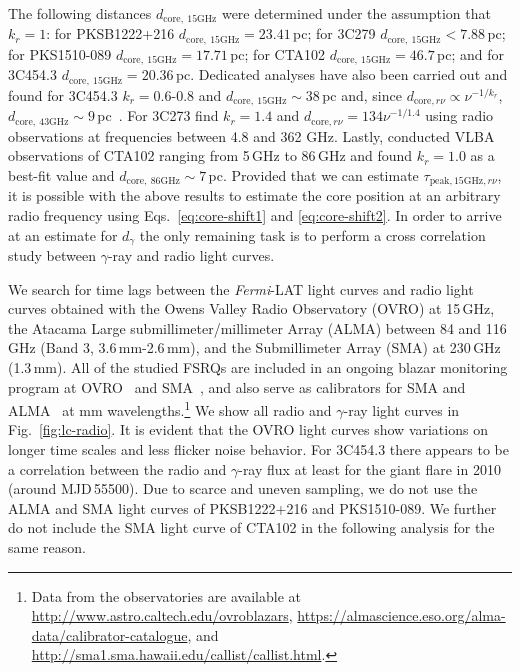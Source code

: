 \documentclass[twocolumn,linenumbers]{aastex62}
\newcommand{\gray}{$\gamma$-ray\xspace}
\newcommand{\fermiLAT}{\emph{Fermi}-LAT\xspace}
\begin{document}
The following distances $d_\mathrm{core,~15GHz}$ were determined  under the assumption that $k_r = 1$: for PKSB1222+216 $d_\mathrm{core,~15GHz}= 23.41\,$pc; for 3C279 $d_\mathrm{core,~15GHz}<7.88$\,pc; for PKS1510-089 $d_\mathrm{core,~15GHz} = 17.71\,$pc; for 
CTA102 $d_\mathrm{core,~15GHz} =46.7\,$pc; and for 3C454.3 $d_\mathrm{core,~15GHz} = 20.36\,$pc.
Dedicated analyses have also been carried out and found for 3C454.3 $k_r = 0.6$-$0.8$ and $d_\mathrm{core,~15GHz} \sim 38\,$pc and, since $d_{\mathrm{core},r\nu}\propto\nu^{-1/k_r}$,  $d_\mathrm{core,~43GHz} \sim 9\,$pc~\citep{2014MNRAS.437.3396K}. 
For 3C273 \citet{2013ARep...57...34V} find $k_r = 1.4$ and $d_{\mathrm{core},r\nu} = 134\nu^{-1/1.4}$ using radio observations at frequencies between 4.8 and 362 GHz.
Lastly, \citet{2015A&A...576A..43F} conducted VLBA observations of CTA102 ranging from 5\,GHz to 86\,GHz and found $k_r = 1.0$ as a best-fit value and $d_{\mathrm{core,~86GHz}}\sim7\,$pc.
Provided that we can estimate $\tau_{\mathrm{peak,15GHz},r\nu}$, it is possible with the above results to estimate the core position at an arbitrary radio frequency using Eqs.~\ref{eq:core-shift1} and \ref{eq:core-shift2}.
In order to arrive at an estimate for $d_\gamma$ the only remaining task is to perform a cross correlation study between \gray and radio light curves.

We search for time lags between the \fermiLAT light curves and radio light curves obtained with the Owens Valley Radio Observatory (OVRO) at 15\,GHz, the Atacama Large submillimeter/millimeter Array (ALMA) between 84 and 116\,GHz (Band 3, 3.6\,mm-2.6\,mm), and the Submillimeter Array (SMA) at 230\,GHz (1.3\,mm). 
All of the studied FSRQs are included in an ongoing blazar monitoring program at OVRO~\citep{2011ApJS..194...29R} and SMA~\citep{2007ASPC..375..234G}, and also serve as calibrators for SMA and ALMA~\citep{2018MNRAS.478.1512B} at mm wavelengths.\footnote{Data from the observatories are available at \url{http://www.astro.caltech.edu/ovroblazars}, \url{https://almascience.eso.org/alma-data/calibrator-catalogue}, and \url{http://sma1.sma.hawaii.edu/callist/callist.html}.}
We show all radio and \gray light curves in Fig.~\ref{fig:lc-radio}.
It is evident that the OVRO light curves show variations on longer time scales and less flicker noise behavior. 
For 3C454.3 there appears to be a correlation between the radio and \gray flux at least for the giant flare in 2010 (around MJD\,55500). 
Due to scarce and uneven sampling, we do not use the ALMA and SMA light curves of PKSB1222+216 and PKS1510-089.
We further do not include the SMA light curve of CTA102 in the following analysis for the same reason.
\end{document}
